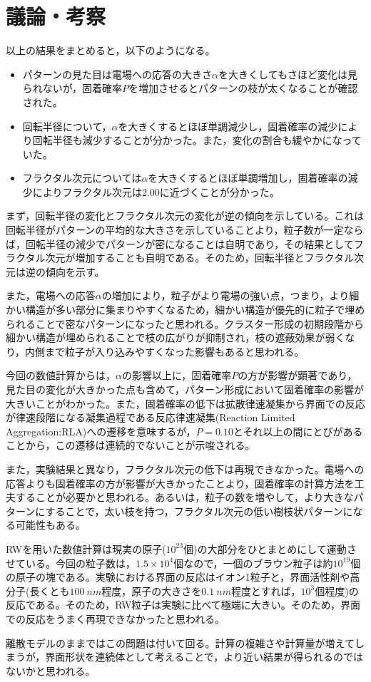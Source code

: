 \documentclass[autodetect-engine,dvi=dvipdfmx,a4paper,ja=standard,oneside,openany,11pt,draft]{bxjsbook}
\begin{document}
\section{議論・考察}
以上の結果をまとめると，以下のようになる。
\begin{itemize}
  \item パターンの見た目は電場への応答の大きさ$\alpha$を大きくしてもさほど変化は見られないが，固着確率$P$を増加させるとパターンの枝が太くなることが確認された。
  \item 回転半径について，$\alpha$を大きくするとほぼ単調減少し，固着確率の減少により回転半径も減少することが分かった。また，変化の割合も緩やかになっていた。
  \item フラクタル次元については$\alpha$を大きくするとほぼ単調増加し，固着確率の減少によりフラクタル次元は2.00に近づくことが分かった。
\end{itemize}

まず，回転半径の変化とフラクタル次元の変化が逆の傾向を示している。これは回転半径がパターンの平均的な大きさを示していることより，粒子数が一定ならば，回転半径の減少でパターンが密になることは自明であり，その結果としてフラクタル次元が増加することも自明である。そのため，回転半径とフラクタル次元は逆の傾向を示す。

また，電場への応答$\alpha$の増加により，粒子がより電場の強い点，つまり，より細かい構造が多い部分に集まりやすくなるため，細かい構造が優先的に粒子で埋められることで密なパターンになったと思われる。クラスター形成の初期段階から細かい構造が埋められることで枝の広がりが抑制され，枝の遮蔽効果が弱くなり，内側まで粒子が入り込みやすくなった影響もあると思われる。

今回の数値計算からは，$\alpha$の影響以上に，固着確率$P$の方が影響が顕著であり，見た目の変化が大きかった点も含めて，パターン形成において固着確率の影響が大きいことがわかった。また，固着確率の低下は拡散律速凝集から界面での反応が律速段階になる凝集過程である反応律速凝集(Reaction Limited Aggregation:RLA)への遷移を意味するが，$P=0.10$とそれ以上の間にとびがあることから，この遷移は連続的でないことが示唆される。

また，実験結果と異なり，フラクタル次元の低下は再現できなかった。電場への応答よりも固着確率の方が影響が大きかったことより，固着確率の計算方法を工夫することが必要かと思われる。あるいは，粒子の数を増やして，より大きなパターンにすることで，太い枝を持つ，フラクタル次元の低い樹枝状パターンになる可能性もある。

RWを用いた数値計算は現実の原子($10^{23}$個)の大部分をひとまとめにして運動させている。今回の粒子数は，$1.5\times10^4$個なので，一個のブラウン粒子は約$10^{19}$個の原子の塊である。実験における界面の反応はイオン1粒子と，界面活性剤や高分子(長くとも$\SI{100}{nm}$程度，原子の大きさを$\SI{0.1}{nm}$程度とすれば，$10^3$個程度)の反応である。そのため，RW粒子は実験に比べて極端に大きい。そのため，界面での反応をうまく再現できなかったと思われる。

離散モデルのままではこの問題は付いて回る。計算の複雑さや計算量が増えてしまうが，界面形状を連続体として考えることで，より近い結果が得られるのではないかと思われる。

\ifdraft{
  
  
}{}
\end{document}
